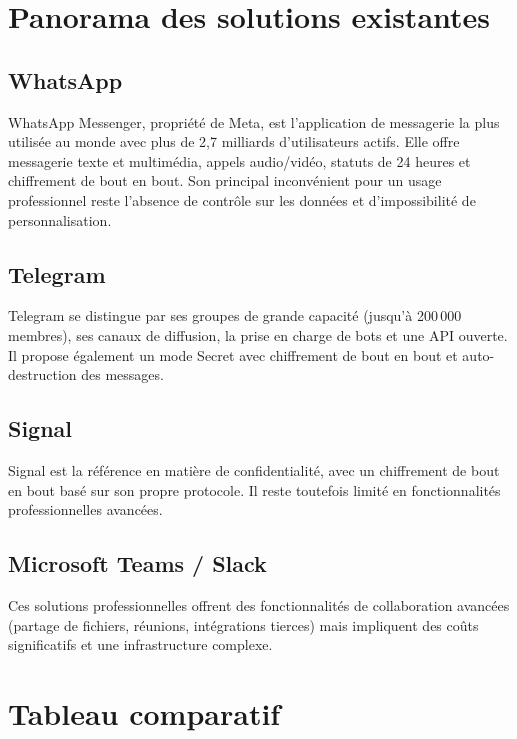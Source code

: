 \documentclass[12pt,a4paper]{report}
\begin{document}
\section{Panorama des solutions existantes}

\subsection{WhatsApp}
WhatsApp Messenger, propriété de Meta, est l'application de messagerie la plus utilisée au monde avec plus de 2,7 milliards d'utilisateurs actifs. Elle offre messagerie texte et multimédia, appels audio/vidéo, statuts de 24 heures et chiffrement de bout en bout. Son principal inconvénient pour un usage professionnel reste l'absence de contrôle sur les données et d'impossibilité de personnalisation.

\subsection{Telegram}
Telegram se distingue par ses groupes de grande capacité (jusqu'à 200\,000 membres), ses canaux de diffusion, la prise en charge de bots et une API ouverte. Il propose également un mode Secret avec chiffrement de bout en bout et auto-destruction des messages.

\subsection{Signal}
Signal est la référence en matière de confidentialité, avec un chiffrement de bout en bout basé sur son propre protocole. Il reste toutefois limité en fonctionnalités professionnelles avancées.

\subsection{Microsoft Teams / Slack}
Ces solutions professionnelles offrent des fonctionnalités de collaboration avancées (partage de fichiers, réunions, intégrations tierces) mais impliquent des coûts significatifs et une infrastructure complexe.

\section{Tableau comparatif}
\end{document}
